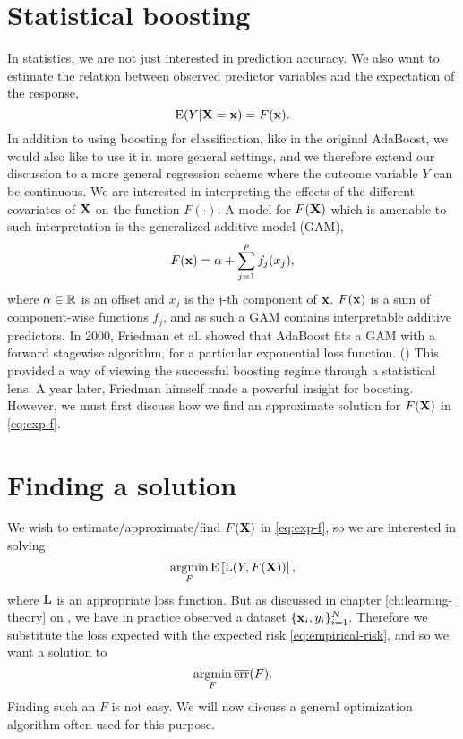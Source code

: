 \section{Statistical boosting}\label{sec:sboost}
In statistics, we are not just interested in prediction accuracy. We also want to estimate the relation between observed predictor variables and the expectation of the response,
\begin{equation}\label{eq:exp-f}
    \operatorname{E}(Y|\mathbf{X}=\mathbf{x})=F(\mathbf{x}).
\end{equation}
In addition to using boosting for classification, like in the original AdaBoost, we would also like to use it in more general settings, and we therefore extend our discussion to a more general regression scheme where the outcome variable $Y$ can be continuous. We are interested in interpreting the effects of the different covariates of $\mathbf{X}$ on the function $F(\cdot)$. A model for $F(\mathbf{X})$ which is amenable to such interpretation is the generalized additive model (GAM),
\begin{equation}\label{eq:gam}
    F(\mathbf{x})=\alpha+\sum_{j=1}^pf_j(x_j),
\end{equation}
where $\alpha\in\mathbb{R}$ is an offset and $x_j$ is the j-th component of $\mathbf{x}$. $F(\mathbf{x})$ is a sum of component-wise functions $f_j$, and as such a GAM contains interpretable additive predictors. In 2000, Friedman et al. showed that AdaBoost fits a GAM with a forward stagewise algorithm, for a particular exponential loss function. (\cite{friedman2000}) This provided a way of viewing the successful boosting regime through a statistical lens. A year later, Friedman himself made a powerful insight for boosting. However, we must first discuss how we find an approximate solution for $F(\mathbf{X})$ in \eqref{eq:exp-f}.

\section{Finding a solution}
We wish to estimate/approximate/find $F(\mathbf{X})$ in \eqref{eq:exp-f}, so we are interested in solving
\begin{equation*}
    \operatorname*{argmin}_{F}\operatorname{E}\left[\operatorname{L}(Y,F(\mathbf{X}))\right],
\end{equation*}
where $\operatorname{L}$ is an appropriate loss function. But as discussed in chapter \ref{ch:learning-theory} on , we have in practice observed a dataset $\{\mathbf{x}_i,y_i\}_{i=1}^N$. Therefore we substitute the loss expected with the expected risk \eqref{eq:empirical-risk}, and so we want a solution to
\begin{equation}\label{eq:argmin-risk}
    \operatorname*{argmin}_{F}\overline{\text{err}}(F).
\end{equation}
Finding such an $F$ is not easy. We will now discuss a general optimization algorithm often used for this purpose.

